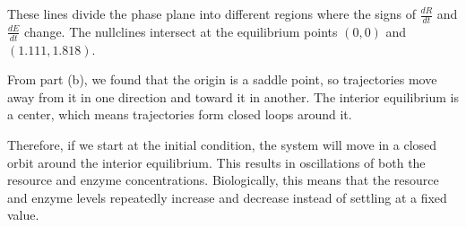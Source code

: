 \documentclass[12pt]{article}
\begin{document}
These lines divide the phase plane into different regions where the signs of $\frac{dR}{dt}$ and $\frac{dE}{dt}$ change. The nullclines intersect at the equilibrium points $(0,0)$ and $(1.111, 1.818)$.

From part (b), we found that the origin is a saddle point, so trajectories move away from it in one direction and toward it in another. The interior equilibrium is a center, which means trajectories form closed loops around it.

Therefore, if we start at the initial condition, the system will move in a closed orbit around the interior equilibrium. This results in oscillations of both the resource and enzyme concentrations. Biologically, this means that the resource and enzyme levels repeatedly increase and decrease instead of settling at a fixed value.
\end{document}
